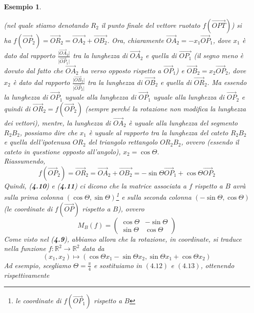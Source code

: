 \message{ !name(algebraegeometria.tex)}\documentclass{book}
\newcommand{\abs}[1]{\lvert#1\rvert}
\newtheorem{esempio}{Esempio}
\begin{document}
\begin{esempio}
\begin{enumerate}
    (nel quale stiamo denotando $R_2$ il punto finale del vettore ruotato $f(\vec{OPT})$) si ha
    $f(\vec{OP}_2)=\vec{OR}_2=\vec{OA_2}+\vec{OB_2}$. Ora, chiaramente $\vec{OA}_2=-x_1\vec{OP}_1$, dove $x_1$ è
    dato dal rapporto $\frac{\abs{\vec{OA}_2}}{\abs{\vec{OP}_1}}$ tra la lunghezza di $\vec{OA}_2$ e quella di
    $\vec{OP_1}$ (il segno meno è dovuto dal fatto che $\vec{OA}_2$ ha verso opposto rispetto a $\vec{OP}_1$) e
    $\vec{OB}_2=x_2\vec{OP}_2$, dove $x_2$ è dato dal rapporto $\frac{\abs{\vec{OB}_2}}{\abs{\vec{OP}_2}}$ tra la
    lunghezza di $\vec{OB}_2$ e quella di $\vec{OR}_2$. Ma essendo la lunghezza di $\vec{OP}_1$ uguale alla
    lunghezza di $\vec{OP}_1$ uguale alla lunghezza di $\vec{OP}_2$ e quindi di $\vec{OR}_2=f(\vec{OP}_2)$
    (sempre perché la rotazione non modifica la lunghezza dei vettori), mentre, la lunghezza di $\vec{OA}_2$ è
    uguale alla lunghezza del segmento $R_2B_2$, possiamo dire che $x_1$ è uguale al rapporto tra la lunghezza
    del cateto $R_2B_2$ e quella dell'ipotenusa $OR_2$ del triangolo rettangolo $OR_2B_2$, ovvero (essendo il
    cateto in questione opposto all'angolo), $x_2=\cos\Theta$.\\
    Riassumendo,
    \begin{equation}
      f(\vec{OP}_2)=\vec{OR}_2=\vec{OA}_2+\vec{OB_2}=-\sin\Theta\vec{OP}_1+\cos \Theta\vec{OP}_2
    \end{equation}
    \clearpage
    Quindi, (\textbf{4.10}) e (\textbf{4.11}) ci dicono che la matrice associata a $f$ rispetto a $B$ avrà sulla
    prima colonna $(\cos\Theta,\sin\Theta)$\footnote{le coordinate di $f(\vec{OP}_1)$ rispetto a $B$} e sulla
    seconda colonna $(-\sin\Theta,\cos\Theta)$ (le coordinate di $f(\vec{OP})$ rispetto a $B$), ovvero
    \begin{equation}
      M_B(f)=
      \begin{pmatrix}
        \cos\Theta & -\sin \Theta\\
        \sin\Theta & \cos \Theta
      \end{pmatrix}
    \end{equation}
    Come visto nel (\textbf{4.9}), abbiamo allora che la rotazione, in coordinate, si traduce nella funzione
    $f:\mathds{R}^2\to\mathds{R}^2$ data da
    \begin{equation}
      (x_1,x_2)\mapsto (\cos\Theta x_1-\sin\Theta x_2,\sin\Theta x_1+\cos\Theta x_2)
    \end{equation}
    Ad esempio, scegliamo $\Theta=\frac{\pi}{4}$ e sostituiamo in $(4.12)$ e $(4.13)$, ottenendo rispettivamente

\end{enumerate}
\end{esempio}
\end{document}
